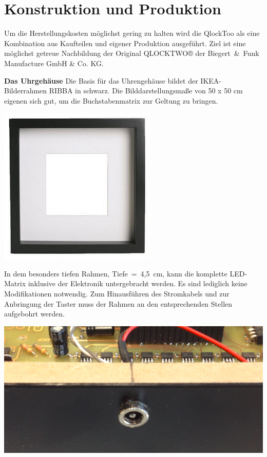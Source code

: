 
\section{Konstruktion und Produktion}
\label{sec:KonstruktionFertigung}

\begin{multicols}{2}
Um die Herstellungskosten möglichst gering zu halten wird die QlockToo als eine Kombination aus Kaufteilen und eigener Produktion ausgeführt. Ziel ist eine möglichst getreue Nachbildung der Original QLOCKTWO® der Biegert~\&~Funk Manufacture GmbH \& Co. KG.

\textbf{Das Uhrgehäuse} Die Basis für das Uhrengehäuse bildet der IKEA-Bilderrahmen RIBBA in schwarz. Die Bilddarstellungsmaße von 50 x 50 cm eigenen sich gut, um die Buchstabenmatrix zur Geltung zu bringen.

{
\centering
\includegraphics[width=0.75\columnwidth]{Abbildungen/Konstruktion/Ribba02} %

}
In dem besonders tiefen Rahmen,  Tiefe~=~4,5~cm, kann die komplette LED-Matrix inklusive der Elektronik untergebracht werden. Es sind lediglich keine Modifikationen notwendig.
Zum Hinausführen des Stromkabels und zur Anbringung der Taster muss der Rahmen an den entsprechenden Stellen aufgebohrt werden.

{
\centering
\includegraphics[width=0.6\columnwidth]{Abbildungen/Konstruktion/Stecker01}

}
\end{multicols}
